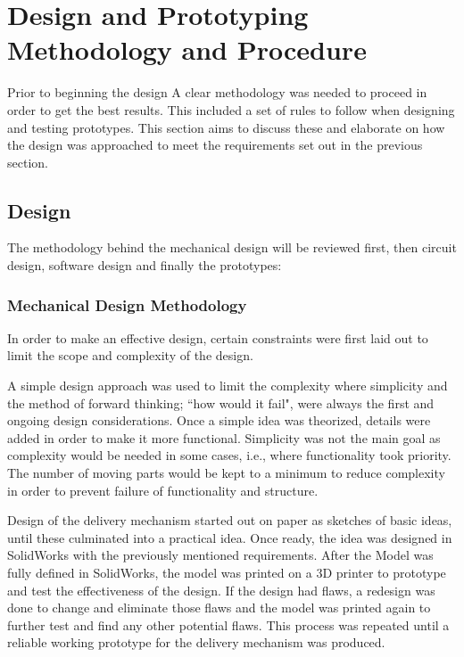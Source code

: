 \documentclass[a4paper,11pt]{article}
\numberwithin{figure}{section}
\numberwithin{table}{section}
\begin{document}
\section[Design and Prototyping Methodology and Procedure]{Design and Prototyping Methodology and Procedure%
}
Prior to beginning the design A clear methodology was needed to proceed in order to get the best results. This included a set of rules to follow when designing and testing prototypes. This section aims to discuss these and elaborate on how the design was approached to meet the requirements set out in the previous section.

\subsection{Design}
The methodology behind the mechanical design will be reviewed first, then circuit design, software design and finally the prototypes:
\subsubsection{Mechanical Design Methodology}
In order to make an effective design, certain constraints were first laid out to limit the scope and complexity of the design.

A simple design approach was used to limit the complexity where simplicity and the method of forward thinking; ``how would it fail", were always the first and ongoing design considerations. Once a simple idea was theorized, details were added in order to make it more functional. Simplicity was not the main goal as complexity would be needed in some cases, i.e., where functionality took priority. The number of moving parts would be kept to a minimum to reduce complexity in order to prevent failure of functionality and structure. 

Design of the delivery mechanism started out on paper as sketches of basic ideas, until these culminated into a practical idea. Once ready, the idea was designed in SolidWorks with the previously mentioned requirements. After the Model was fully defined in SolidWorks, the model was printed on a 3D printer to prototype and test the effectiveness of the design. If the design had flaws, a redesign was done to change and eliminate those flaws and the model was printed again to further test and find any other potential flaws. This process was repeated until a reliable working prototype for the delivery mechanism was produced.
\end{document}

